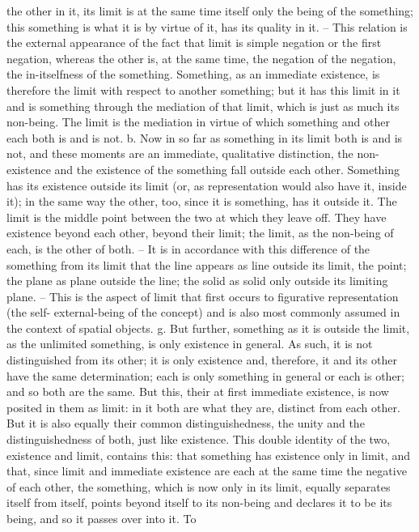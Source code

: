 the other in it, its limit is at the same time itself only the being of the
something; this something is what it is by virtue of it, has its quality in it. –
This relation is the external appearance of the fact that limit is simple
negation or the first negation, whereas the other is, at the same time, the
negation of the negation, the in-itselfness of the something.
Something, as an immediate existence, is therefore the limit with respect
to another something; but it has this limit in it and is something through
the mediation of that limit, which is just as much its non-being. The limit
is the mediation in virtue of which something and other each both is and
is not.
b. Now in so far as something in its limit both is and is not, and these
moments are an immediate, qualitative distinction, the non-existence and
the existence of the something fall outside each other. Something has its
existence outside its limit (or, as representation would also have it, inside it);
in the same way the other, too, since it is something, has it outside it. The
limit is the middle point between the two at which they leave off. They have
existence beyond each other, beyond their limit; the limit, as the non-being
of each, is the other of both.
– It is in accordance with this difference of the something from its limit
that the line appears as line outside its limit, the point; the plane as plane
outside the line; the solid as solid only outside its limiting plane. – This
is the aspect of limit that first occurs to figurative representation (the self-
external-being of the concept) and is also most commonly assumed in the
context of spatial objects.
g. But further, something as it is outside the limit, as the unlimited
something, is only existence in general. As such, it is not distinguished
from its other; it is only existence and, therefore, it and its other have the
same determination; each is only something in general or each is other;
and so both are the same. But this, their at first immediate existence, is now
posited in them as limit: in it both are what they are, distinct from each
other. But it is also equally their common distinguishedness, the unity and
the distinguishedness of both, just like existence. This double identity of
the two, existence and limit, contains this: that something has existence
only in limit, and that, since limit and immediate existence are each at the
same time the negative of each other, the something, which is now only
in its limit, equally separates itself from itself, points beyond itself to its
non-being and declares it to be its being, and so it passes over into it. To
